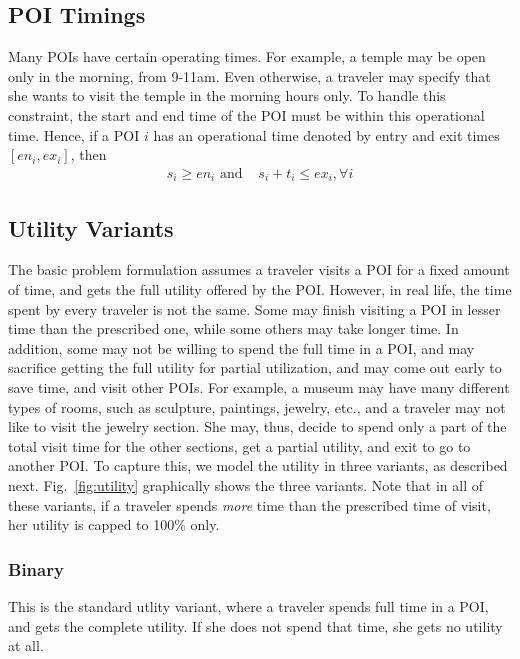 \subsection{POI Timings}
\label{sec:timings}

Many POIs have certain operating times.  For example, a temple may be open
only in the morning, from 9-11am.  Even otherwise, a traveler may specify that she wants to visit the temple in the morning hours only.  To handle this constraint, the start and
end time of the POI must be within this operational time.  Hence, if a POI
$i$ has an operational time denoted by entry and exit times $[en_i, ex_i]$,
then
%
\begin{align}
	\label{eq:operational}
	s_i \geq en_i \text{ and } & s_i + t_{i} \leq ex_i, \forall i
\end{align}

\subsection{Utility Variants}
\label{sec:utility}

The basic problem formulation assumes a traveler visits a POI for a fixed amount
of time, and gets the full utility offered by the POI.  However, in real life,
the time spent by every traveler is not the same.  Some may finish visiting a
POI in lesser time than the prescribed one, while some others may take longer
time.  In addition, some may not be willing to spend the full time in a POI, and
may sacrifice getting the full utility for partial utilization, and may come out
early to save time, and visit other POIs.  For example, a museum may have many
different types of rooms, such as sculpture, paintings, jewelry, etc., and a
traveler may not like to visit the jewelry section.  She may, thus, decide to
spend only a part of the total visit time for the other sections, get a partial
utility, and exit to go to another POI.  To capture this, we model the utility
in three variants, as described next.
Fig.~\ref{fig:utility} graphically shows the three variants.
Note that in all of these variants, if a traveler spends \emph{more} time
than the prescribed time of visit, her utility is capped to 100\% only.

\subsubsection{\textbf{Binary}}
\label{sec:binary}

This is the standard utlity variant, where a traveler spends full time in a
POI, and gets the complete utility.  If she does not spend that time, she
gets no utility at all.

